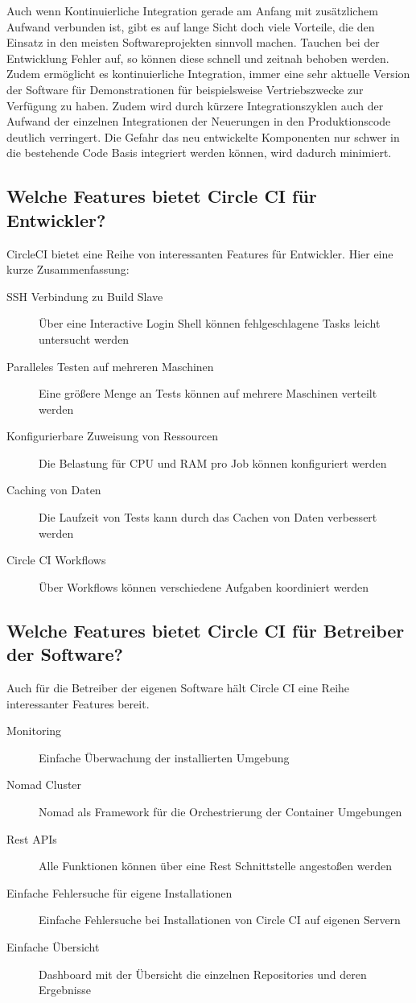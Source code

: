 \documentclass{article}
\begin{document}
Auch wenn Kontinuierliche Integration gerade am Anfang mit zusätzlichem Aufwand verbunden ist, gibt es auf lange Sicht doch viele Vorteile, die den Einsatz in den meisten Softwareprojekten sinnvoll machen.
Tauchen bei der Entwicklung Fehler auf, so können diese schnell und zeitnah behoben werden.
Zudem ermöglicht es kontinuierliche Integration, immer eine sehr aktuelle Version der Software für Demonstrationen für beispielsweise Vertriebszwecke zur Verfügung zu haben. Zudem wird durch kürzere Integrationszyklen auch der Aufwand der einzelnen Integrationen der Neuerungen in den Produktionscode deutlich verringert.
Die Gefahr das neu entwickelte Komponenten nur schwer in die bestehende Code Basis integriert werden können, wird dadurch minimiert.

\subsection{Welche Features bietet Circle CI für Entwickler?}
CircleCI bietet eine Reihe von interessanten Features für Entwickler. Hier eine kurze Zusammenfassung:

\begin{description}
\item[SSH Verbindung zu Build Slave] Über eine Interactive Login Shell können fehlgeschlagene Tasks leicht untersucht werden
\item[Paralleles Testen auf mehreren Maschinen] Eine größere Menge an Tests können auf mehrere Maschinen verteilt werden
\item[Konfigurierbare Zuweisung von Ressourcen] Die Belastung für CPU und RAM pro Job können konfiguriert werden
\item[Caching von Daten]Die Laufzeit von Tests kann durch das Cachen von Daten verbessert werden
\item[Circle CI Workflows] Über Workflows können verschiedene Aufgaben koordiniert werden
\end{description}

\subsection{Welche Features bietet Circle CI für Betreiber der Software?}
Auch für die Betreiber der eigenen Software hält Circle CI eine Reihe interessanter Features bereit.

\begin{description}
\item[Monitoring] Einfache Überwachung der installierten Umgebung
\item[Nomad Cluster] Nomad als Framework für die Orchestrierung der Container Umgebungen
\item[Rest APIs]Alle Funktionen können über eine Rest Schnittstelle angestoßen werden
\item[Einfache Fehlersuche für eigene Installationen] Einfache Fehlersuche bei Installationen von Circle CI auf eigenen Servern
\item[Einfache Übersicht] Dashboard mit der Übersicht die einzelnen Repositories und deren Ergebnisse
\end{description}
\end{document}
